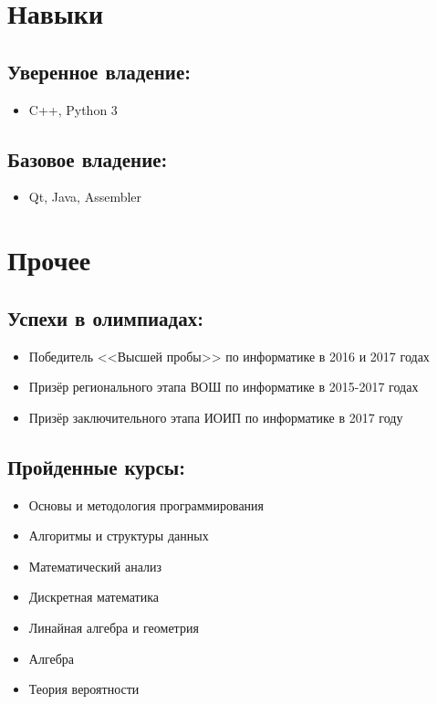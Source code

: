 \documentclass[letterpaper]{article}
\begin{document}
\section*{Навыки}
\subsection*{Уверенное владение:}
\begin{itemize}
	\item C++, Python 3
\end{itemize}
\subsection*{Базовое владение:}
\begin{itemize}
	\item Qt, Java, Assembler
\end{itemize}

\section*{Прочее}
\subsection*{Успехи в олимпиадах:}
\begin{itemize}
	\item Победитель <<Высшей пробы>> по информатике в 2016 и 2017 годах
	\item Призёр регионального этапа ВОШ по информатике в 2015-2017 годах
	\item Призёр заключительного этапа ИОИП по информатике в 2017 году
\end{itemize}
\subsection*{Пройденные курсы:}
\begin{itemize}
	\item Основы и методология программирования
	\item Алгоритмы и структуры данных
	\item Математический анализ
	\item Дискретная математика
	\item Линайная алгебра и геометрия
	\item Алгебра
	\item Теория вероятности
\end{itemize}
\end{document}
